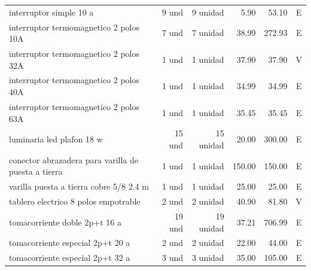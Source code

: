 \begin{landscape}
\begin{longtable}{p{8.0cm}r r r r c}
interruptor simple 10 a & 9 und & 9 unidad & 5.90 & 53.10 & E \\
interruptor termomagnetico 2 polos 10A & 7 und & 7 unidad & 38.99 & 272.93 & E \\
interruptor termomagnetico 2 polos 32A & 1 und & 1 unidad & 37.90 & 37.90 & V \\
interruptor termomagnetico 2 polos 40A & 1 und & 1 unidad & 34.99 & 34.99 & E \\
interruptor termomagnetico 2 polos 63A & 1 und & 1 unidad & 35.45 & 35.45 & E \\
luminaria led plafon 18 w & 15 und & 15 unidad & 20.00 & 300.00 & E \\
conector abrazadera para varilla de puesta a tierra & 1 und & 1 unidad & 150.00 & 150.00 & E \\
varilla puesta a tierra cobre 5/8 2.4 m & 1 und & 1 unidad & 25.00 & 25.00 & E \\
tablero electrico 8 polos empotrable & 2 und & 2 unidad & 40.90 & 81.80 & V \\
tomacorriente doble 2p+t 16 a & 19 und & 19 unidad & 37.21 & 706.99 & E \\
tomacorriente especial 2p+t 20 a & 2 und & 2 unidad & 22.00 & 44.00 & E \\
tomacorriente especial 2p+t 32 a & 3 und & 3 unidad & 35.00 & 105.00 & E \\
\bottomrule\end{longtable}\normalsize\end{landscape}
